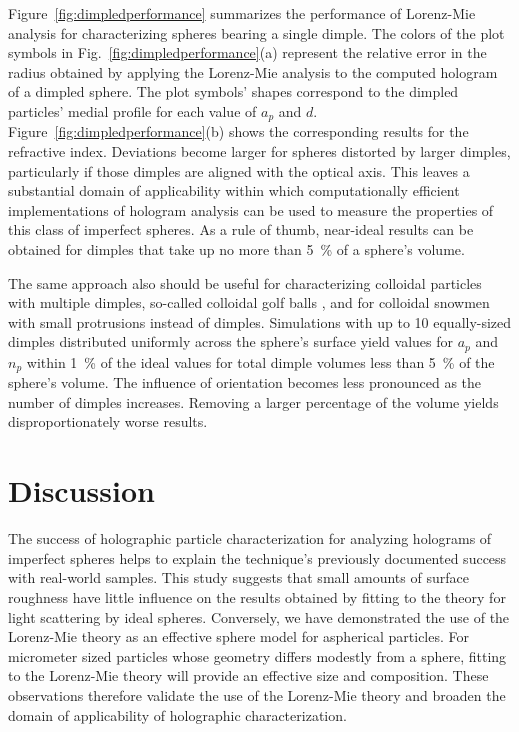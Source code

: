 Figure~\ref{fig:dimpledperformance} summarizes the performance of
Lorenz-Mie analysis for characterizing spheres bearing a single
dimple.
The colors of the plot symbols
in Fig.~\ref{fig:dimpledperformance}(a) represent the relative
error in the radius obtained by applying the Lorenz-Mie analysis
to the computed hologram of a dimpled sphere.
The plot symbols' shapes correspond to the
dimpled particles' medial profile for each value of $a_p$ and $d$.
Figure~\ref{fig:dimpledperformance}(b) shows the corresponding
results for the refractive index.
Deviations become larger for spheres distorted by larger dimples,
particularly if those dimples are aligned with the optical axis.
This leaves a substantial domain of applicability within which
computationally efficient implementations of hologram analysis
can be used to measure the properties of this class of
imperfect spheres.
As a rule of thumb, near-ideal results can be obtained for dimples
that take up no more than \SI{5}{\percent} of a sphere's volume.

The same approach also should be useful for characterizing
colloidal particles with multiple dimples, so-called colloidal golf
balls \cite{dai13},
and for colloidal snowmen \cite{chaturvedi12}
with small protrusions instead of dimples.
Simulations with up to 10 equally-sized dimples distributed
uniformly across the sphere's surface yield values for
$a_p$ and $n_p$ within \SI{1}{\percent} of the ideal values for total dimple
volumes less than \SI{5}{\percent} of the sphere's volume.
The influence of orientation becomes less pronounced as the number
of dimples increases.
Removing a larger percentage of the volume 
yields disproportionately worse results.

\section{Discussion}

The success of holographic particle characterization for analyzing
holograms of imperfect spheres helps to explain the technique's
previously documented success with real-world samples.
This study suggests that small amounts of surface roughness have
little influence on the results obtained by fitting to the theory
for light scattering by ideal spheres.
Conversely, we have demonstrated the use of the Lorenz-Mie theory
as an effective sphere model for aspherical particles. For micrometer
sized particles whose geometry differs modestly from a sphere,
fitting to the Lorenz-Mie theory will provide an effective size and
composition.
These observations therefore validate the use of the Lorenz-Mie theory
and broaden the domain of applicability of holographic characterization.


